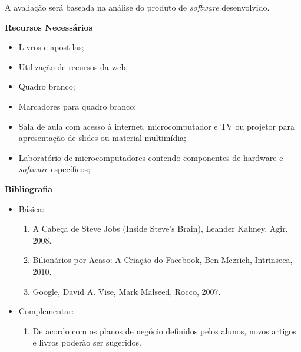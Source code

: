 \noindent
A avalia\c{c}\~ao ser\'a baseada na an\'alise do produto de \textit{software} desenvolvido.

\begin{snugshade}\begin{center}\textbf{
    Recursos Necessários
    \vphantom{q} %
}\end{center}\end{snugshade}

\begin{itemize}
  \item Livros e apostilas;
  \item Utilização de recursos da web;
  \item Quadro branco;
  \item Marcadores para quadro branco;
  \item Sala de aula com acesso à internet, microcomputador e TV ou projetor para apresentação de slides ou material multimídia;
  \item Laboratório de microcomputadores contendo componentes de hardware e \textit{software} específicos;
\end{itemize}


\begin{snugshade}\begin{center}\textbf{
    Bibliografia
}\end{center}\end{snugshade}

\begin{itemize} 

  \item Básica:
	\begin{enumerate}
		\item A Cabeça de Steve Jobs (Inside Steve's Brain), Leander Kahney, Agir, 2008.
		\item Bilionários por Acaso: A Criação do Facebook, Ben Mezrich, Intrinseca, 2010.
		\item Google, David A. Vise, Mark Malseed, Rocco, 2007.
	\end{enumerate}
  \item Complementar:
	\begin{enumerate} 
		\item De acordo com os planos de negócio definidos pelos alunos, novos artigos e livros poderão ser sugeridos.
	\end{enumerate}
\end{itemize}
